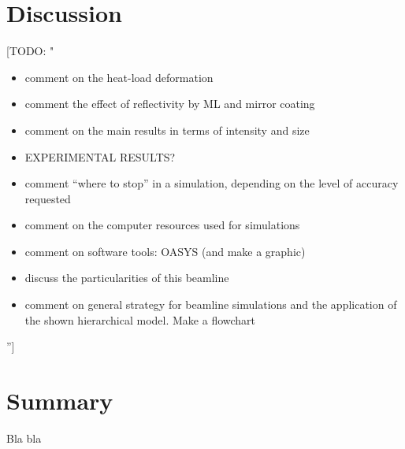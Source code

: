\documentclass{iucr}              %
\newcommand{\todo}[1]{{\color{red}[TODO: "#1'']}}
\begin{document}
\section{Discussion} 

\todo{
\begin{itemize}
 \item comment on the heat-load deformation 
 \item comment the effect of reflectivity by ML and mirror coating
 \item comment on the main results in terms of intensity and size
 \item EXPERIMENTAL RESULTS?
 \item comment ``where to stop'' in a simulation, depending on the level of accuracy requested
 \item comment on the computer resources used for simulations
 \item comment on software tools: OASYS (and make a graphic)
 \item discuss the particularities of this beamline 
 \item comment on general strategy for beamline simulations and the application of the shown hierarchical model. Make a flowchart
\end{itemize}
}

\section{Summary}

Bla bla



\end{document}
